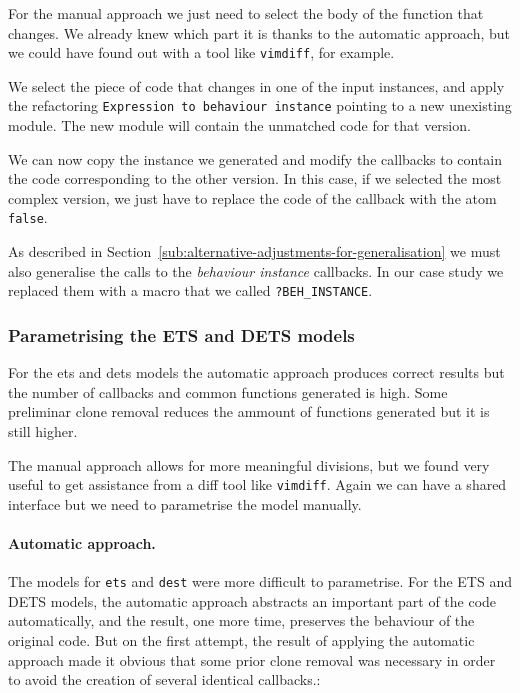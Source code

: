 For the manual approach we just need to select the body of the function that 
changes. We already knew which part it is thanks to the automatic approach, 
but we could have found out with a tool like \texttt{vimdiff}, for example.

We select the piece of code that changes in one of the input instances, and 
apply the refactoring \texttt{Expression to behaviour instance} pointing to a 
new unexisting module. The new module will contain the unmatched code for that 
version.

We can now copy the instance we generated and modify the callbacks to contain 
the code corresponding to the other version. In this case, if we selected the 
most complex version, we just have to replace the code of the callback with the 
atom \texttt{false}.

As described in Section~\ref{sub:alternative-adjustments-for-generalisation} we 
must also generalise the calls to the \emph{behaviour instance} callbacks. In 
our case study we replaced them with a macro that we called 
\texttt{?BEH\_INSTANCE}.

\subsubsection{Parametrising the ETS and DETS models}

For the ets and dets models the automatic approach produces correct 
results but the number of callbacks and common functions generated is 
high. Some preliminar clone removal reduces the ammount of functions 
generated but it is still higher.


The manual approach allows for more meaningful divisions, but we found 
very useful to get assistance from a diff tool like \texttt{vimdiff}. Again we 
can have a shared interface but we need to parametrise the model 
manually.

\paragraph{Automatic approach.}

The models for \texttt{ets} and \texttt{dest} were more difficult to 
parametrise. For the ETS and DETS models, the automatic approach abstracts an 
important part of the code automatically, and the result, one more time, 
preserves the behaviour of the original code. But on the first attempt, the 
result of applying the automatic approach made it obvious that some prior clone 
removal was necessary in order to avoid the creation of several identical 
callbacks.:

